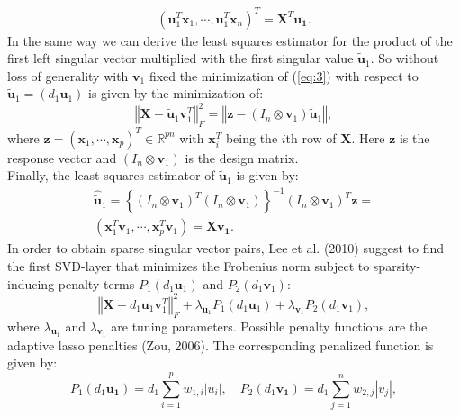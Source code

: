 \documentclass{bioinfo}
\begin{document}
\begin{methods}
\begin{equation}
\begin{split}
(\mathbf{u}_{1}^{T}\mathbf{x}_{1},\cdots,\mathbf{u}_{1}^{T}\mathbf{x}_{n})^{T}=\mathbf{X}^{T}\mathbf{u_{1}}.
\end{split}
\end{equation}
In the same way we can derive the least squares estimator for the product of the first left singular vector multiplied with the first singular value $\mathbf{\tilde{u}}_{1}$. So without loss of generality with $\mathbf{v}_1$ fixed the minimization of (\ref{eq:3}) with respect to $\mathbf{\tilde{u}}_{1}=(d_{1}\mathbf{u}_{1})$ is given by the minimization of:
\begin{equation}
\left\Vert \mathbf{X} - \mathbf{\tilde{u}}_{1}\mathbf{v}_{1}^{T}\right\Vert_{F}^{2}=
\left\Vert \mathbf{z}-(I_{n}\otimes\mathbf{v}_{1})\mathbf{\tilde{u}}_{1}\right\Vert,
\label{eq:6}
\end{equation}
where $\mathbf{z}=(\mathbf{x}_{1},\cdots,\mathbf{x}_{p})^{T} \in \mathbb{R}^{pn}$ with $\mathbf{x}_{i}^{T}$ being the $i$th row of $\mathbf{X}$. Here $\mathbf{z}$ is the response vector and $(I_{n}\otimes\mathbf{v}_{1})$ is the design matrix.\\
Finally, the least squares estimator of $\mathbf{\tilde{u}}_{1}$ is given by:
\begin{equation}
\begin{split}
\mathbf{\hat{\tilde{u}}}_{1}=
\left\{(I_{n}\otimes\mathbf{v}_{1})^T(I_{n}\otimes\mathbf{v}_{1})\right\}^{-1}(I_{n}\otimes\mathbf{v}_{1})^T\mathbf{z}=\\
(\mathbf{x}_{1}^{T}\mathbf{v}_{1},\cdots,\mathbf{x}_{p}^{T}\mathbf{v}_{1})=\mathbf{X}\mathbf{v_{1}}.
\end{split}
\end{equation}
In order to obtain sparse singular vector pairs, Lee et al. (2010) suggest to find the first SVD-layer that minimizes the Frobenius norm subject to sparsity-inducing penalty terms $P_{1}(d_{1}\mathbf{u}_{1})$ and $P_{2}(d_{1}\mathbf{v}_{1})$:
\begin{equation} \left\Vert \mathbf{X} - d_{1}\mathbf{u}_{1}\mathbf{v}_{1}^{T}\right\Vert_{F}^{2} + \lambda_{\mathbf{u}_{1}}P_{1}(d_{1} \mathbf{u}_{1}) + \lambda_{\mathbf{v}_{1}}P_{2}(d_{1} \mathbf{v}_{1}),
\label{eq:8}
\end{equation}
where $\lambda_{\mathbf{u}_{1}}$ and $\lambda_{\mathbf{v}_{1}}$ are tuning parameters. Possible penalty functions are the adaptive lasso penalties (Zou, 2006)\nocite{Zou2006}. The corresponding penalized function is given by:
\begin{equation}
P_{1}(d_{1}\mathbf{u_{1}})=d_{1}\sum_{i=1}^{p}w_{1,i}|u_{i}|,\quad P_{2}(d_{1} \mathbf{v_{1}})=d_{1}\sum_{j=1}^{n}w_{2,j}|v_{j}|,

\end{equation}
\end{methods}
\end{document}

